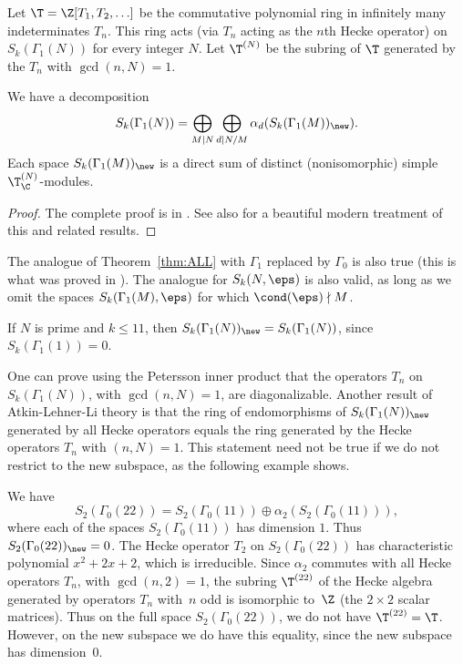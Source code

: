 Let $\T = \Z[T_1, T_2, \ldots ]$ be the commutative polynomial ring
in infinitely many indeterminates $T_n$. This
ring acts (via $T_n$ acting as the $n$th Hecke operator)
on $S_k(\Gamma_1(N))$ for every integer $N$.  Let
$\T^{(N)}$ be the subring of $\T$ generated by the $T_n$ with
$\gcd(n,N)=1$.

\begin{theorem}\label{thm:ALL}
We have a decomposition
\begin{equation}\label{eqn:decomp}
  S_k(\Gamma_1(N)) = 
   \bigoplus_{M\mid N} \bigoplus_{d\mid N/M} \alpha_d(S_k(\Gamma_1(M))_{\new}).
\end{equation}
Each space $S_k(\Gamma_1(M))_{\new}$ is a direct
sum of distinct (nonisomorphic) simple $\T^{(N)}_{\C}$-modules.
\end{theorem}
\begin{proof}
The complete proof is in \cite{winnie:newforms}.
See also \cite[Ch.~5]{diamond-shurman} for a beautiful
modern treatment of this and related results.
\end{proof}
The analogue of Theorem~\ref{thm:ALL} with $\Gamma_1$ replaced by
$\Gamma_0$ is also true (this is what was proved in
\cite{atkin-lehner}).  The analogue for $S_k(N,\eps)$ is also valid,
as long as we omit the spaces $S_k(\Gamma_1(M),\eps)$ for which
$\cond(\eps) \nmid M$.

\begin{example}
If $N$ is prime and $k\leq 11$, then 
$S_k(\Gamma_1(N))_{\new} = S_k(\Gamma_1(N))$,
since $S_k(\Gamma_1(1))=0$.   
\end{example}

One can prove using the Petersson inner product that the 
operators $T_n$ on $S_k(\Gamma_1(N))$, with $\gcd(n,N)=1$, are
diagonalizable.  Another result of Atkin-Lehner-Li theory is that the
ring of endomorphisms of $S_k(\Gamma_1(N))_{\new}$ generated by all
Hecke operators equals the ring generated by the Hecke operators $T_n$
with $(n,N)=1$.  This statement need not be true if we do not
restrict to the new subspace, as the following example shows. 
\begin{example}\label{ex:onlyold}
We have
$$
  S_2(\Gamma_0(22)) = S_2(\Gamma_0(11)) \oplus \alpha_2(S_2(\Gamma_0(11))),
$$
where each of the spaces $S_2(\Gamma_0(11))$ has dimension $1$.  Thus
$S_2(\Gamma_0(22))_{\new} = 0$.  The Hecke operator $T_2$ on 
$S_2(\Gamma_0(22))$ has characteristic polynomial $x^2+2x+2$,
which is irreducible.  Since $\alpha_2$ commutes with all Hecke 
operators $T_n$, with $\gcd(n,2)=1$, the subring $\T^{(22)}$ of the Hecke
algebra generated by operators $T_n$ with~$n$ odd is isomorphic
to~$\Z$ (the $2\times 2$ scalar matrices).  Thus on the full space
$S_2(\Gamma_0(22))$, we do not have $\T^{(22)}=\T$.  However, on the new subspace 
we do have this equality, since the new subspace has dimension~$0$.
\end{example}

